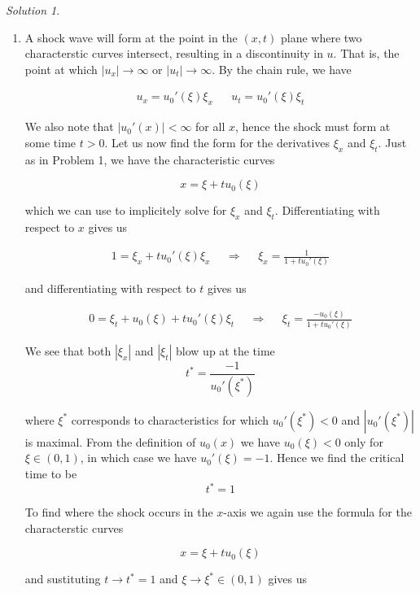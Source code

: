 \documentclass[12pt,a4paper]{article}
\theoremstyle{definition}
\theoremstyle{remark}
\newtheorem*{solution}{Solution}
\begin{document}
  \begin{solution}
    \mbox{}
    \begin{enumerate}[label=(\alph*)]
      \item A shock wave will form at the point in the $(x,t)$ plane where two characterstic curves intersect, resulting in a discontinuity in $u$. That is, the point at which $|u_x| \rightarrow \infty$ or $|u_t| \rightarrow \infty$. By the chain rule, we have 
      
      \begin{align*}
        u_x = u_0'(\xi) \xi_x && u_t = u_0'(\xi) \xi_t
      \end{align*}

      We also note that $|u_0'(x)| < \infty$ for all $x$, hence the shock must form at some time $t>0$. Let us now find the form for the derivatives $\xi_x$ and $\xi_t$. Just as in Problem 1, we have the characteristic curves 

      $$x = \xi + tu_0(\xi)$$

      which we can use to implicitely solve for $\xi_x$ and $\xi_t$. Differentiating with respect to $x$ gives us 

      \begin{align*}
        1 = \xi_x + tu_0'(\xi)\xi_x && \Rightarrow && \xi_x = \frac{1}{1+tu_0'(\xi)}
      \end{align*}

      and differentiating with respect to $t$ gives us 

      \begin{align*}
        0 = \xi_t + u_0(\xi) + tu_0'(\xi)\xi_t && \Rightarrow && \xi_t = \frac{-u_0(\xi)}{1 + tu_0'(\xi)}
      \end{align*}

      We see that both $|\xi_x|$ and $|\xi_t|$ blow up at the time $$t^* = \frac{-1}{u_0'(\xi^*)}$$

      where $\xi^*$ corresponds to characteristics for which $u_0'(\xi^*)<0$ and $|u_0'(\xi^*)|$ is maximal. From the definition of $u_0(x)$ we have $u_0(\xi) < 0$ only for $\xi \in (0,1)$, in which case we have $u_0'(\xi) =-1$. Hence we find the critical time to be $$t^* = 1$$

      To find where the shock occurs in the $x$-axis we again use the formula for the characterstic curves 

      $$x = \xi + tu_0(\xi)$$

      and sustituting $t \rightarrow t^*=1$ and $\xi \rightarrow \xi^* \in (0,1)$ gives us 


\end{enumerate}
\end{solution}
\end{document}
